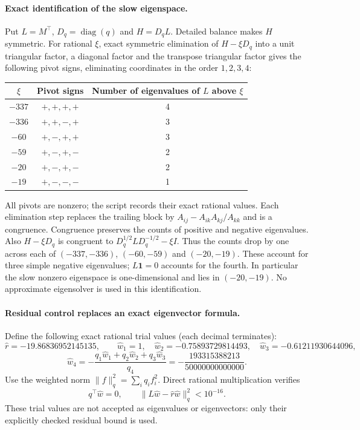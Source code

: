\documentclass[11pt]{article}
\newcommand{\diag}{\operatorname{diag}}
\begin{document}
\paragraph{Exact identification of the slow eigenspace.}
Put $L=M^\top$, $D_q=\diag(q)$ and $H=D_qL$. Detailed balance makes $H$ symmetric. For rational $\xi$, exact symmetric elimination of $H-\xi D_q$ into a unit triangular factor, a diagonal factor and the transpose triangular factor gives the following pivot signs, eliminating coordinates in the order $1,2,3,4$:
\begin{center}
\begin{tabular}{c c c}
\toprule $\xi$&Pivot signs&Number of eigenvalues of $L$ above $\xi$\\\midrule
$-337$&$+,+,+,+$&4\\
$-336$&$+,+,-,+$&3\\
$-60$&$+,-,+,+$&3\\
$-59$&$+,-,+,-$&2\\
$-20$&$+,-,+,-$&2\\
$-19$&$+,-,-,-$&1\\\bottomrule
\end{tabular}
\end{center}
All pivots are nonzero; the script records their exact rational values. Each elimination step replaces the trailing block by $A_{ij}-A_{ik}A_{kj}/A_{kk}$ and is a congruence. Congruence preserves the counts of positive and negative eigenvalues. Also $H-\xi D_q$ is congruent to $D_q^{1/2}LD_q^{-1/2}-\xi I$. Thus the counts drop by one across each of $(-337,-336)$, $(-60,-59)$ and $(-20,-19)$. These account for three simple negative eigenvalues; $L\mathbf1=0$ accounts for the fourth. In particular the slow nonzero eigenspace is one-dimensional and lies in $(-20,-19)$. No approximate eigensolver is used in this identification.

\paragraph{Residual control replaces an exact eigenvector formula.}
Define the following exact rational trial values (each decimal terminates):
\[
\widehat r=-19.86836952145135,\qquad
\widehat w_1=1,\quad
\widehat w_2=-0.75893729814493,\quad
\widehat w_3=-0.61211930644096,
\]
\[
\widehat w_4=-\frac{q_1\widehat w_1+q_2\widehat w_2+q_3\widehat w_3}{q_4}
=-\frac{193315388213}{50000000000000}.
\]
Use the weighted norm $\|f\|_q^2=\sum_iq_if_i^2$. Direct rational multiplication verifies
\[
q^\top\widehat w=0,\qquad
\|L\widehat w-\widehat r\widehat w\|_q^2<10^{-16}.
\]
These trial values are not accepted as eigenvalues or eigenvectors: only their explicitly checked residual bound is used.
\end{document}

